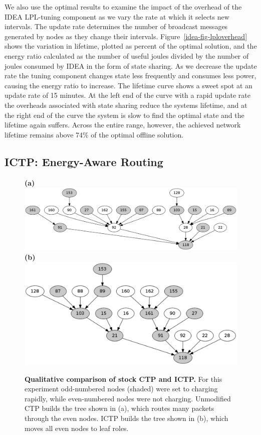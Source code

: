 We also use the optimal results to examine the impact of the overhead of the
IDEA LPL-tuning component as we vary the rate at which it selects new
intervals. The update rate determines the number of broadcast messages
generated by nodes as they change their intervals.
Figure~\ref{idea-fig-lploverhead} shows the variation in lifetime, plotted as
percent of the optimal solution, and the energy ratio calculated as the
number of useful joules divided by the number of joules consumed by IDEA in
the form of state sharing. As we decrease the update rate the tuning
component changes state less frequently and consumes less power, causing the
energy ratio to increase. The lifetime curve shows a sweet spot at an update
rate of 15 minutes. At the left end of the curve with a rapid update rate the
overheads associated with state sharing reduce the systems lifetime, and at
the right end of the curve the system is slow to find the optimal state and
the lifetime again suffers. Across the entire range, however, the achieved
network lifetime remains above 74\% of the optimal offline solution.

\subsection{ICTP: Energy-Aware Routing}

\begin{figure}[t]
\begin{center}
\textbf{(a)}\\
\includegraphics[width=0.7\hsize]{./5-idea/figs/ctp.pdf}\\
\textbf{(b)}\\
\includegraphics[width=0.7\hsize]{./5-idea/figs/ictp.pdf}\\
\end{center}

\caption{\textbf{Qualitative comparison of stock CTP and ICTP.} For this
experiment odd-numbered nodes (shaded) were set to charging rapidly, while
even-numbered nodes were not charging. Unmodified CTP builds the tree shown
in (a), which routes many packets through the even nodes. ICTP builds the
tree shown in (b), which moves all even nodes to leaf roles.}

\label{idea-fig-ictpqualitative}
\end{figure}

